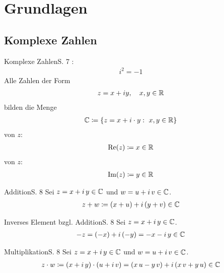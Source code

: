\section{Grundlagen}



\subsection{Komplexe Zahlen}

\begin{bemerkung}{Komplexe Zahlen}{S. 7}
  :
  \begin{align}
    i^2 = -1
  \end{align}
  Alle Zahlen der Form
  \begin{align}
    z = x + iy, \quad x,y \in \mathbb{R}
  \end{align}
  bilden die Menge
  \begin{align}
    \mathbb{C} \coloneqq \{ z = x + i \cdot y :\ x,y \in \mathbb{R} \}
  \end{align}
   von $z$:
  \begin{align}
    \operatorname{Re}(z) \coloneqq x \in \mathbb{R}
  \end{align}
   von $z$:
  \begin{align}
    \operatorname{Im}(z) \coloneqq y \in \mathbb{R}
  \end{align}
\end{bemerkung}

\begin{bemerkung}{Addition}{S. 8}
  Sei $z = x + i \, y \in \mathbb{C}$ und $w = u + i \, v \in \mathbb{C}$.
  \begin{align}
    \label{eq:addition}
    z + w \coloneqq (x + u) + i \, (y + v) \in \mathbb{C}
  \end{align}
\end{bemerkung}

\begin{bemerkung}{Inverses Element bzgl. Addition}{S. 8}
  Sei $z = x + i \, y \in \mathbb{C}$.
  \begin{align}
    \label{eq:inv_addition}
    -z = (-x) + i \, (-y) = - x - i \, y \in \mathbb{C}
  \end{align}
\end{bemerkung}

\begin{bemerkung}{Multiplikation}{S. 8}
  Sei $z = x + i \, y \in \mathbb{C}$ und $w = u + i \, v \in \mathbb{C}$.
  \begin{align}
    \label{eq:multiplikation}
    z \cdot w
      \coloneqq (x + i \, y) \cdot (u + i \, v)
      = (x \, u - y \, v) + i \, (x \, v + y \, u)
      \in \mathbb{C}
  \end{align}
\end{bemerkung}

